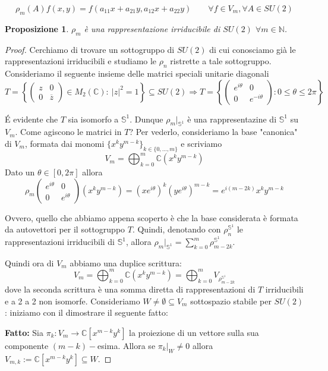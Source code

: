 \documentclass[11pt]{article}
\theoremstyle{plain}
\newtheorem{prop}[thm]{Proposizione}
\theoremstyle{definition}
\theoremstyle{remark}
\newcommand{\C}{\mathbb{C}}
\newcommand{\N}{\mathbb{N}}
\begin{document}
 \[
 \rho_m(A) f(x, y) = f(a_{11} x + a_{21} y , a_{12} x + a_{22} y) \qquad \forall f \in V_m, \forall A \in SU(2)
 \]

\begin{prop} $\rho_m$ è una rappresentazione irriducibile di $SU(2)$ $\forall m\in \N$.
\label{prop:irrid su2}
\end{prop}
\begin{proof} Cerchiamo di trovare un sottogruppo di $SU(2)$ di cui conosciamo già le rappresentazioni irriducibili e studiamo le $\rho_n$ ristrette a tale sottogruppo. Consideriamo il seguente insieme delle matrici speciali unitarie diagonali
\[T=
\left\{\begin{pmatrix}
z & 0\\
 0& \overline{z}
\end{pmatrix}\in M_2(\C):\ |z|^2=1 \right\}\subseteq SU(2)\Rightarrow T= \left\{\begin{pmatrix}
e^{i\theta}& 0\\
 0& e^{-i\theta}
\end{pmatrix}: 0\leq \theta \leq 2\pi \right\}\]

\'E evidente che $T$ sia isomorfo a $\mathbb{S}^1$. Dunque $\rho_m|_{\mathbb{S}^1}$ è una rappresentazine di $\mathbb{S}^1$ su $V_m$. Come agiscono le matrici in $T$? Per vederlo, consideriamo la base "canonica" di $V_m$, formata dai monomi $\{ x^ky^{m-k} \}_{k \in \{0, ..., m\}}$ e scriviamo
\[V_m=\bigoplus_{k=0}^m \C (x^k y^{m-k})\]
Dato un $\theta\in [0,2\pi]$ allora
\[\rho_m\begin{pmatrix}
e^{i\theta} & 0\\
 0& e^{i\theta}
\end{pmatrix} (x^ky^{m-k}) = (xe^{i\theta})^k(ye^{i\theta})^{m-k}=e^{i(m-2k)} x^k y^{m-k} \]

Ovvero, quello che abbiamo appena scoperto è che la base considerata è formata da autovettori per il sottogruppo $T$. Quindi, denotando con $\rho_n^{\mathbb{S}^1}$ le rappresentazioni irriducibili di $\mathbb{S}^1$, allora $\rho_m|_{\mathbb{S}^1}=\sum_{k=0}^{m}\rho_{m-2k}^{\mathbb{S}^1}$.

Quindi ora di $V_m$ abbiamo una duplice scrittura:
\[V_m=\bigoplus_{k=0}^m \C (x^k y^{m-k})=\bigoplus_{k=0}^m V_{\rho_{m-2k}^{\mathbb{S}^1}}\]
dove la seconda scrittura è una somma diretta di rappresentazioni di $T$ irriducibili e a 2 a 2 non isomorfe. Consideriamo $W\neq \emptyset \subseteq V_m$ sottospazio stabile per $SU(2)$: iniziamo con il dimostrare il seguente fatto:

\textbf{Fatto:} Sia $\pi_k:V_m\rightarrow \C [x^{m-k}y^k]$ la proiezione di un vettore sulla sua componente $(m-k)-$esima. Allora se $\pi_k|_W\neq 0$ allora $V_{m,k}:=\C[ x^{m-k}y^k]\subseteq W$.


\end{proof}
\end{document}
